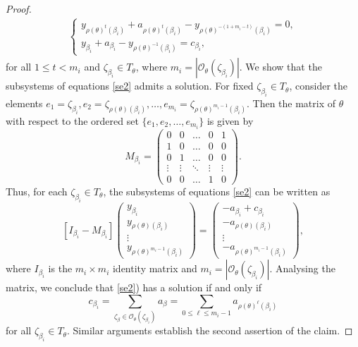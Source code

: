 \documentclass[12pt]{amsart}
\numberwithin{equation}{section}
\begin{document}
\begin{proof}
\begin{align}
\begin{cases}
		y_{\rho(\theta)^t(\beta_i)}+a_{\rho(\theta)^t(\beta_i)}-y_{\rho(\theta)^{-(1+m_{i}-t)}(\beta_i)}=0,\\
		y_{\beta_i}+a_{\beta_i}-y_{\rho(\theta)^{-1}(\beta_i)}=c_{\beta_i},
	\end{cases}
\end{align}
for all $1\le t<m_{i}$ and $\zeta_{\beta_i}\in T_{\theta}$, where $m_{i}=|\mathcal{O}_{\theta}(\zeta_{\beta_i})|$.  We show that the subsystems of equations \eqref{se2} admits a solution. For fixed $\zeta_{\beta_i}\in T_{\theta}$, consider the elements $e_1=\zeta_{\beta_i},e_2=\zeta_{\rho(\theta)(\beta_i)},\dots,e_{m_{i}}=\zeta_{\rho(\theta)^{m_{i}-1}(\beta_i)}$. Then the  matrix of $\theta$ with respect to the ordered set $\{e_1,e_2,\dots,e_{m_i}\}$ is given by
$$M_{\beta_i}=
\left(\begin{matrix}	0&0&\ldots&0&1\\
	1&0&\ldots&0&0\\
	0&1&\ldots&0&0\\
	\vdots&\vdots&\ddots&\vdots&\vdots\\ 
	0&0&\ldots&1&0
\end{matrix}\right).
$$
Thus, for each $\zeta_{\beta_i}\in T_{\theta}$, the subsystems of equations \eqref{se2} can be written as
$$
[I_{\beta_i}-M_{\beta_i}]
\left(\begin{matrix}
	y_{\beta_i}\\
	y_{\rho(\theta)(\beta_i)}\\
	\vdots\\
	y_{\rho(\theta)^{m_{i}-1}(\beta_i)}
\end{matrix}\right)=
\left(\begin{matrix}	-a_{\beta_i}+c_{\beta_i}\\
	-a_{\rho(\theta)(\beta_i)}\\
	\vdots\\
	-a_{\rho(\theta)^{m_{i}-1}(\beta_i)}
\end{matrix}\right),
$$ 
where $I_{\beta_i}$ is the $m_{i}\times m_{i}$ identity matrix and $m_i=|\mathcal{O}_{\theta}(\zeta_{\beta_i})|$. Analysing the matrix, we conclude that \eqref{se2}) has a solution if and only if $$c_{\beta_i}=\sum_{\zeta_\beta\in\mathcal{O}_{\theta}(\zeta_{\beta_i})}{a_\beta}=\sum_{0 \le \ell \le m_{i}-1} a_{\rho(\theta)^\ell(\beta_i)}$$ for all $\zeta_{\beta_i}\in T_{\theta}$. Similar arguments establish the second assertion of the claim. 
\par


\end{proof}
\end{document}
